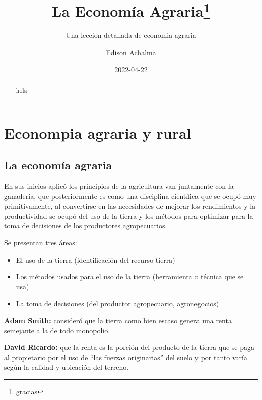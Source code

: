 \documentclass[
  a4paper,
]{article}
\title{La Economía Agraria\thanks{gracias}}
\subtitle{Una leccion detallada de economia agraria}
\author{Edison Achalma}
\date{2022-04-22}
\begin{document}
\maketitle
\begin{abstract}
hola
\end{abstract}
\ifdefined\Shaded\renewenvironment{Shaded}{\begin{tcolorbox}[frame hidden, enhanced, interior hidden, boxrule=0pt, borderline west={3pt}{0pt}{shadecolor}, breakable, sharp corners]}{\end{tcolorbox}}\fi

\hypertarget{econompia-agraria-y-rural}{%
\section{Econompia agraria y rural}\label{econompia-agraria-y-rural}}

\hypertarget{la-economuxeda-agraria}{%
\subsection{La economía agraria}\label{la-economuxeda-agraria}}

En sus inicios aplicó los principios de la agricultura van juntamente
con la ganadería, que posteriormente es como una disciplina científica
que se ocupó muy primitivamente, al convertirse en las necesidades de
mejorar los rendimientos y la productividad se ocupó del uso de la
tierra y los métodos para optimizar para la toma de decisiones de los
productores agropecuarios.

Se presentan tres áreas:

\begin{itemize}
\item
  El uso de la tierra (identificación del recurso tierra)
\item
  Los métodos usados para el uso de la tierra (herramienta o técnica que
  se usa)
\item
  La toma de decisiones (del productor agropecuario, agronegocios)
\end{itemize}

\textbf{Adam Smith:} consideró que la tierra como bien escaso genera una
renta semejante a la de todo monopolio.

\textbf{David Ricardo:} que la renta es la porción del producto de la
tierra que se paga al propietario por el uso de ``las fuerzas
originarias'' del suelo y por tanto varía según la calidad y ubicación
del terreno.
\end{document}
